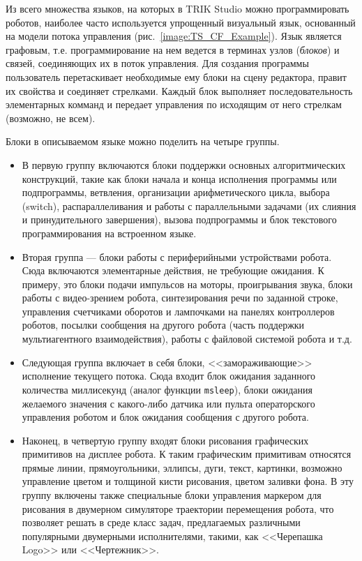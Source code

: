 \documentclass[a5paper]{article}
\begin{document}
Из всего множества языков, на которых в TRIK Studio можно программировать роботов, наиболее часто используется упрощенный визуальный язык, основанный на модели потока управления (рис.~\ref{image:TS_CF_Example}). Язык является графовым, т.е. программирование на нем ведется в терминах узлов (\textit{блоков}) и связей, соединяющих их в поток управления. Для создания программы пользователь перетаскивает необходимые ему блоки на сцену редактора, правит их свойства и соединяет стрелками. Каждый блок выполняет последовательность элементарных комманд и передает управления по исходящим от него стрелкам (возможно, не всем).

Блоки в описываемом языке можно поделить на четыре группы.
\begin{itemize}
    \item В первую группу включаются блоки поддержки основных алгоритмических конструкций, такие как блоки начала и конца исполнения программы или подпрограммы, ветвления, организации арифметического цикла, выбора (switch), распараллеливания и работы с параллельными задачами (их слияния и принудительного завершения), вызова подпрограммы и блок текстового программирования на встроенном языке.
    \item Вторая группа --- блоки работы с периферийными устройствами робота. Сюда включаются элементарные действия, не требующие ожидания. К примеру, это блоки подачи импульсов на моторы, проигрывания звука, блоки работы с видео-зрением робота, синтезирования речи по заданной строке, управления счетчиками оборотов и лампочками на панелях контроллеров роботов, посылки сообщения на другого робота (часть поддержки мультиагентного взаимодействия), работы с файловой системой робота и т.д.
    \item Следующая группа включает в себя блоки, <<замораживающие>> исполнение текущего потока. Сюда входит блок ожидания заданного количества миллисекунд (аналог функции \texttt{msleep}), блоки ожидания желаемого значения с какого-либо датчика или пульта операторского управления роботом и блок ожидания сообщения с другого робота.
    \item Наконец, в четвертую группу входят блоки рисования графических примитивов на дисплее робота. К таким графическим примитивам относятся прямые линии, прямоугольники, эллипсы, дуги, текст, картинки, возможно управление цветом и толщиной кисти рисования, цветом заливки фона. В эту группу включены также специальные блоки управления маркером для рисования в двумерном симуляторе траектории перемещения робота, что позволяет решать в среде класс задач, предлагаемых различными популярными двумерными исполнителями, такими, как <<Черепашка Logo>> или <<Чертежник>>.
\end{itemize}
\end{document}
